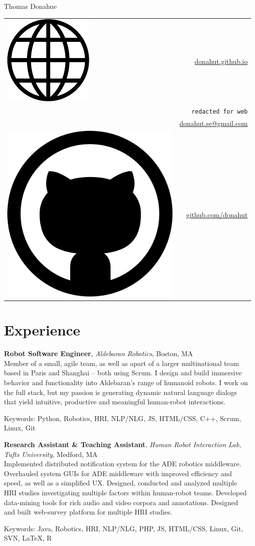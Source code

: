 \documentclass[10pt, letter]{article}
\newcommand*\globe{\includegraphics[height=1.6ex]{globe.pdf}}
\newcommand*\github{\includegraphics[height=2ex]{github.pdf}}
\newcommand{\years}[1]{\marginnote{\footnotesize #1}}
\newenvironment{desc*}{
  \begin{description}
    \setlength{\itemsep}{0.2pt}
    \setlength{\parskip}{-1pt}
    \setlength{\parsep}{0pt}
  }{
  \end{description}
}
\begin{document}
\begin{minipage}[t]{0.55\textwidth}
  {\Huge Thomas Donahue}
\end{minipage}
\begin{minipage}[t]{0.45\textwidth}
  \flushright 
  \begin{tabular}[h]{lr}
    \globe{}    & \href{http://donahut.github.io}{donahut.github.io}\\    
    \Phone{}    & \texttt{redacted for web}\\
    \Envelope{} & \href{mailto:donahut.se@gmail.com}{donahut.se@gmail.com}\\    
    \github{}   & \href{http://www.github.com/donahut}{github.com/donahut}
  \end{tabular}
\end{minipage}

\section*{Experience}
\years{Mar 2014--}
\textbf{Robot Software Engineer}, \textsl{Aldebaran Robotics}, Boston, MA\\
Member of a small, agile team, as well as apart of a larger
multinational team based in Paris and Shanghai -- both
using Scrum. I design and build immersive behavior and functionality
into Aldebaran's range of humanoid robots. I work on the full stack,
but my passion is generating dynamic natural language dialogs that
yield intuitive, productive and meaningful human-robot interactions.
\begin{desc*}
\item[Keywords:] Python, Robotics, HRI, NLP/NLG, JS, HTML/CSS, C++, Scrum,
  Linux, Git
\end{desc*}

\years{2012 - 2014} 
\textbf{Research Assistant \& Teaching Assistant}, 
\textsl{Human Robot Interaction Lab, Tufts University}, Medford, MA\\
Implemented distributed notification system for the ADE robotics
middleware. Overhauled system GUIs for ADE middleware with improved
efficiency and speed, as well as a simplified UX. Designed, conducted
and analyzed multiple HRI studies investigating multiple factors within
human-robot teams. Developed data-mining tools for rich audio and
video corpora and annotations. Designed and built web-survey platform
for multiple HRI studies.
\begin{desc*}
\item[Keywords:] Java, Robotics, HRI, NLP/NLG, PHP, JS, HTML/CSS, Linux, Git,
  SVN, \LaTeX, R
\end{desc*}
\end{document}
